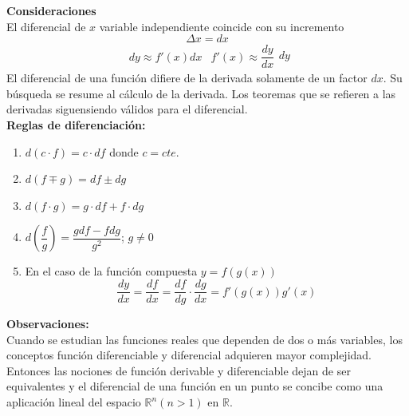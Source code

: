\documentclass[10pt,twoside]{SelfArx} %
\begin{document}
  
  \textbf{Consideraciones}\\
  El diferencial de $ x $ variable independiente coincide con su incremento 
  \[ \Delta x=dx \]
  \[ 
  \begin{array}{ll}
  dy\approx f'(x)dx & f'(x)\approx\dfrac{dy}{dx}
  \end{array}dy \]
  El diferencial de una funci\'on difiere de la derivada solamente de un factor $ dx $. Su búsqueda se resume al c\'alculo de la derivada. Los teoremas que se refieren a las derivadas siguensiendo v\'alidos para el diferencial.\\
  \textbf{Reglas de diferenciaci\'on:}\\
  \begin{enumerate}
  	\item $ d(c\cdot f)=c\cdot df $ donde $ c=cte $.
  	\item $ d(f\mp g)=df\pm dg $
  	\item $ d(f\cdot g)=g\cdot df+f\cdot dg $
  	\item $ d\left (\dfrac{f}{g}\right )=\dfrac{gdf-fdg}{g^{2}} $; $ g\neq0 $
  	\item En el caso de la funci\'on compuesta $ y=f(g(x)) $
  	\begin{equation}
  	\dfrac{dy}{dx}=\dfrac{df}{dx}=\dfrac{df}{dg}\cdot\dfrac{dg}{dx}=f'(g(x))g'(x)
  	\end{equation}
  \end{enumerate}
  \textbf{Observaciones:}\\
  Cuando se estudian las funciones reales que dependen de dos o más variables, los
  conceptos función diferenciable y diferencial adquieren mayor complejidad. Entonces las
  nociones de función derivable y diferenciable dejan de ser equivalentes y el diferencial de
  una función en un punto se concibe como una aplicación lineal del espacio $ \mathbb{R}^{n}(n>1) $ en $ \mathbb{R} $.
  
  
  
  
\end{document}

